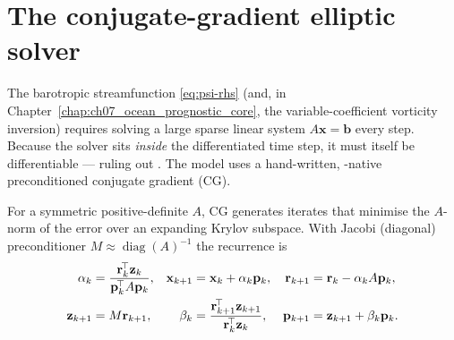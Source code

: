\section{The conjugate-gradient elliptic solver}\label{sec:cg}

The barotropic streamfunction \eqref{eq:psi-rhs} (and, in
Chapter~\ref{chap:ch07_ocean_prognostic_core}, the variable-coefficient vorticity
inversion) requires solving a large sparse linear system $A\mathbf{x}=\mathbf{b}$
every step. Because the solver sits \emph{inside} the differentiated time step, it
must itself be differentiable --- ruling out . The
model uses a hand-written, \jax-native preconditioned conjugate gradient (CG).

For a symmetric positive-definite $A$, CG generates iterates that minimise the
$A$-norm of the error over an expanding Krylov subspace. With Jacobi (diagonal)
preconditioner $M\approx\operatorname{diag}(A)^{-1}$ the recurrence is
\begin{align}
  \alpha_k &= \frac{\mathbf{r}_k^{\!\top}\mathbf{z}_k}{\mathbf{p}_k^{\!\top}A\mathbf{p}_k},
  &\mathbf{x}_{k+1} &= \mathbf{x}_k + \alpha_k\mathbf{p}_k,
  &\mathbf{r}_{k+1} &= \mathbf{r}_k - \alpha_k A\mathbf{p}_k,\notag\\
  \mathbf{z}_{k+1} &= M\mathbf{r}_{k+1},
  &\beta_k &= \frac{\mathbf{r}_{k+1}^{\!\top}\mathbf{z}_{k+1}}{\mathbf{r}_k^{\!\top}\mathbf{z}_k},
  &\mathbf{p}_{k+1} &= \mathbf{z}_{k+1} + \beta_k\mathbf{p}_k.
  \label{eq:cg}
\end{align}

